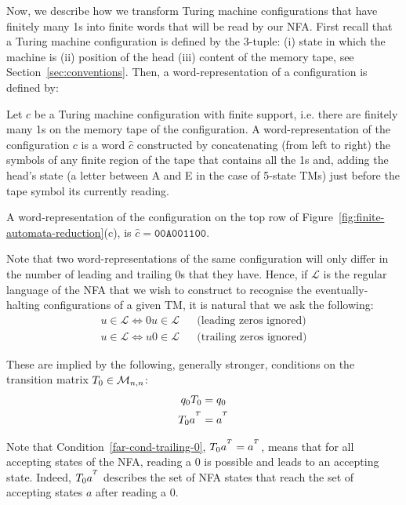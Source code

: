 Now, we describe how we transform Turing machine configurations that have finitely many 1s into finite words that will be read by our NFA. First recall that a Turing machine configuration is defined by the 3-tuple: (i) state in which the machine is (ii) position of the head (iii) content of the memory tape, see Section~\ref{sec:conventions}. Then, a word-representation of a configuration is defined by:

\begin{definition}\label{def:wordc}\normalfont
  Let $c$ be a Turing machine configuration with finite support, i.e. there are finitely many 1s on the memory tape of the configuration. A word-representation of the configuration $c$ is a word $\hat{c}$ constructed by concatenating (from left to right) the symbols of any finite region of the tape that contains all the 1s and, adding the head's state (a letter between A and E in the case of 5-state TMs) just before the tape symbol its currently reading.
\end{definition}

\begin{example}\normalfont
  A word-representation of the configuration on the top row of Figure~\ref{fig:finite-automata-reduction}(c), is $\hat{c} = \texttt{00A001100}$.
\end{example}

Note that two word-representations of the same configuration will only differ in the number of leading and trailing 0s that they have. Hence, if $\mathcal{L}$ is the regular language of the NFA that we wish to construct to recognise the eventually-halting configurations of a given TM, it is natural that we ask the following:
\begin{align*}
  u \in \mathcal{L} \iff 0u \in \mathcal{L} &  & \text{(leading zeros ignored)}
  \\
  u \in \mathcal{L} \iff u0 \in \mathcal{L} &  & \text{(trailing zeros ignored)}
\end{align*}

These are implied by the following, generally stronger, conditions on the transition matrix $T_0 \in \mathcal{M}_{n,n}$:
\begin{align}
  q_0 T_0    & = q_0
  \label{far-cond-leading-0}
  \\
  T_0 a^{^T} & = a^{^T}
  \label{far-cond-trailing-0}
\end{align}


Note that Condition~\ref{far-cond-trailing-0}, $T_0 a^{^T} = a^{^T}$, means that for all accepting states of the NFA, reading a 0 is possible and leads to an accepting state. Indeed, $T_0 a^{^T}$ describes the set of NFA states that reach the set of accepting states $a$ after reading a $0$.


